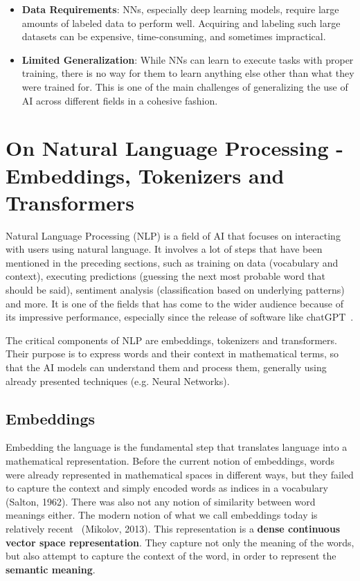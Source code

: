 \documentclass[a4paper, 11pt]{report}
\begin{document}
\begin{itemize}
\item \textbf{Data Requirements}: NNs, especially deep learning models, require large amounts of labeled data to perform well. Acquiring and labeling such large datasets can be expensive, time-consuming, and sometimes impractical.

\item \textbf{Limited Generalization}: While NNs can learn to execute tasks with proper training, there is no way for them to learn anything else other than what they were trained for. This is one of the main challenges of generalizing the use of AI across different fields in a cohesive fashion.
\end{itemize}

\section{On Natural Language Processing - Embeddings, Tokenizers and Transformers}\label{Theory: Embeddings}

Natural Language Processing (NLP) is a field of AI that focuses on interacting with users using natural language. It involves a lot of steps that have been mentioned in the preceding sections, such as training on data (vocabulary and context), executing predictions (guessing the next most probable word that should be said), sentiment analysis (classification based on underlying patterns) and more. It is one of the fields that has come to the wider audience because of its impressive performance, especially since the release of software like chatGPT~\cite{GPTopenai}.

The critical components of NLP are embeddings, tokenizers and transformers. Their purpose is to express words and their context in mathematical terms, so that the AI models can understand them and process them, generally using already presented techniques (e.g. Neural Networks).

\subsection{Embeddings}\label{Theory: Embeddings and Tokenizers}
Embedding the language is the fundamental step that translates language into a mathematical representation. Before the current notion of embeddings, words were already represented in mathematical spaces in different ways, but they failed to capture the context and simply encoded words as indices in a vocabulary~\cite{Salton1962_Wordindex} (Salton, 1962). There was also not any notion of similarity between word meanings either. The modern notion of what we call embeddings today is relatively recent~\cite{Mikolov2013_Efficient, Mikolov2013_Distributed} (Mikolov, 2013). This representation is a \textbf{dense continuous vector space representation}. They capture not only the meaning of the words, but also attempt to capture the context of the word, in order to represent the \textbf{semantic meaning}.
\end{document}

